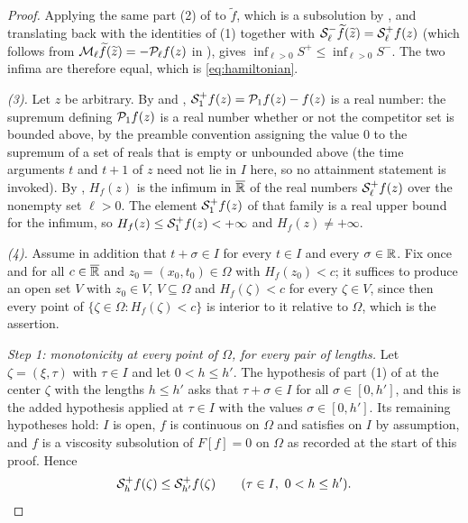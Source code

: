 \begin{proof}
Applying the same part (2) of  to $\widetilde f$,
which is a subsolution by , and translating back with the
identities of (1) together with
$\mathcal{S}_\ell^-\widetilde f(\widetilde z)=\mathcal{S}_\ell^+f(z)$ (which follows from
$\mathcal{M}_\ell\widetilde f(\widetilde z)=-\mathcal{P}_\ell f(z)$ in
), gives $\inf_{\ell>0}S^+\le\inf_{\ell>0}S^-$. The two
infima are therefore equal, which is \eqref{eq:hamiltonian}.

\emph{(3).} Let $z$ be arbitrary. By  and ,
$\mathcal{S}_1^+f(z)=\mathcal{P}_1f(z)-f(z)$ is a real number: the supremum defining
$\mathcal{P}_1f(z)$ is a real number whether or not the competitor set is bounded
above, by the preamble convention assigning the value $0$ to the supremum of a
set of reals that is empty or unbounded above (the time arguments $t$ and $t+1$
of $z$ need not lie in $I$ here, so no attainment statement is invoked). By
, $H_f(z)$ is the infimum in $\overline{\mathbb{R}}$ of the real
numbers $\mathcal{S}_\ell^+f(z)$ over the nonempty set $\ell>0$. The element
$\mathcal{S}_1^+f(z)$ of that family is a real upper bound for the infimum, so
$H_f(z)\le\mathcal{S}_1^+f(z)<+\infty$ and $H_f(z)\ne+\infty$.

\emph{(4).} Assume in addition that $t+\sigma\in I$ for every $t\in I$ and every
$\sigma\in\mathbb{R}$. Fix once and for all $c\in\overline{\mathbb{R}}$ and $z_0=(x_0,t_0)\in\Omega$
with $H_f(z_0)<c$; it suffices to produce an open set $V$ with $z_0\in V$,
$V\subseteq\Omega$ and $H_f(\zeta)<c$ for every $\zeta\in V$, since then every
point of $\{\zeta\in\Omega:H_f(\zeta)<c\}$ is interior to it relative to
$\Omega$, which is the assertion.

\emph{Step 1: monotonicity at every point of $\Omega$, for every pair of
lengths.} Let $\zeta=(\xi,\tau)$ with $\tau\in I$ and let $0<h\le h'$. The
hypothesis of part (1) of  at the center $\zeta$
with the lengths $h\le h'$ asks that $\tau+\sigma\in I$ for all
$\sigma\in[0,h']$, and this is the added hypothesis applied at $\tau\in I$ with
the values $\sigma\in[0,h']$. Its remaining hypotheses hold: $I$ is open, $f$ is
continuous on $\Omega$ and satisfies  on $I$ by
assumption, and $f$ is a viscosity subsolution of $F[f]=0$ on $\Omega$ as
recorded at the start of this proof. Hence
\begin{equation}\label{eq:ehs-mono}
  \mathcal{S}_h^+f(\zeta)\le\mathcal{S}_{h'}^+f(\zeta)
  \qquad(\tau\in I,\ 0<h\le h').
\end{equation}


\end{proof}
